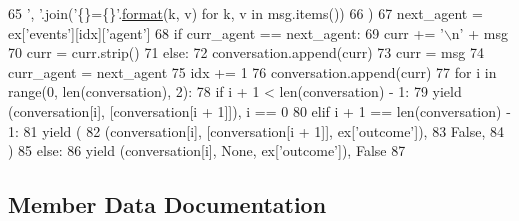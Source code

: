 \begin{DoxyCode}
65                             \textcolor{stringliteral}{', '}.join(\textcolor{stringliteral}{'\{\}=\{\}'}.\hyperlink{namespaceparlai_1_1chat__service_1_1services_1_1messenger_1_1shared__utils_a32e2e2022b824fbaf80c747160b52a76}{format}(k, v) \textcolor{keywordflow}{for} k, v \textcolor{keywordflow}{in} msg.items())
66                         )
67                     next\_agent = ex[\textcolor{stringliteral}{'events'}][idx][\textcolor{stringliteral}{'agent'}]
68                     \textcolor{keywordflow}{if} curr\_agent == next\_agent:
69                         curr += \textcolor{stringliteral}{'\(\backslash\)n'} + msg
70                         curr = curr.strip()
71                     \textcolor{keywordflow}{else}:
72                         conversation.append(curr)
73                         curr = msg
74                         curr\_agent = next\_agent
75                     idx += 1
76                 conversation.append(curr)
77                 \textcolor{keywordflow}{for} i \textcolor{keywordflow}{in} range(0, len(conversation), 2):
78                     \textcolor{keywordflow}{if} i + 1 < len(conversation) - 1:
79                         \textcolor{keywordflow}{yield} (conversation[i], [conversation[i + 1]]), i == 0
80                     \textcolor{keywordflow}{elif} i + 1 == len(conversation) - 1:
81                         \textcolor{keywordflow}{yield} (
82                             (conversation[i], [conversation[i + 1]], ex[\textcolor{stringliteral}{'outcome'}]),
83                             \textcolor{keyword}{False},
84                         )
85                     \textcolor{keywordflow}{else}:
86                         \textcolor{keywordflow}{yield} (conversation[i], \textcolor{keywordtype}{None}, ex[\textcolor{stringliteral}{'outcome'}]), \textcolor{keyword}{False}
87 \end{DoxyCode}


\subsection{Member Data Documentation}
\mbox{\label{classparlai_1_1tasks_1_1mutualfriends_1_1agents_1_1DefaultTeacher_a72fe5fce4948609f6744730626aef8b1}} 
